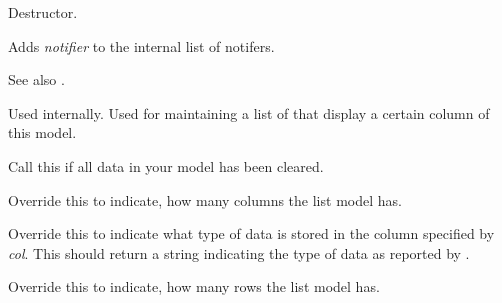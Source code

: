 \label{wxdataviewlistmodeldtor}


Destructor.

\label{wxdataviewlistmodeladdnotifier}


Adds {\it notifier} to the internal list of notifers.

See also .

\label{wxdataviewlistmodeladdviewingcolumn}


Used internally. Used for maintaining a list of
 that
display a certain column of this model.

\label{wxdataviewlistmodelcleared}


Call this if all data in your model has been cleared.

\label{wxdataviewlistmodelgetcolumncount}


Override this to indicate, how many columns the list
model has.

\label{wxdataviewlistmodelgetcolumntype}


Override this to indicate what type of data is stored in the
column specified by {\it col}. This should return a string
indicating the type of data as reported by .

\label{wxdataviewlistmodelgetrowcount}


Override this to indicate, how many rows the list
model has.

